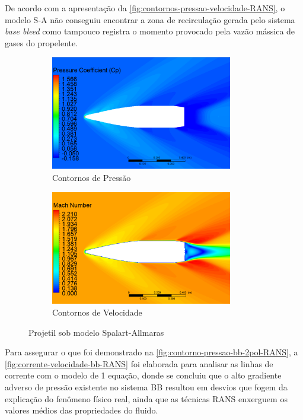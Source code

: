 De acordo com a apresentação da \autoref{fig:contornos-pressao-velocidade-RANS}, o modelo S-A não conseguiu encontrar a zona de recirculação gerada pelo sistema \textit{base bleed} como tampouco registra o momento provocado pela vazão mássica de gases do propelente.

\begin{figure}[!ht]
	\centering
	\begin{subfigure}[b]{0.47\textwidth}
        \centering
        \includegraphics[height=5cm,width=\textwidth]{contorno-pressao-SPALART-2pol.png}
        \caption{Contornos de Pressão}
        \label{fig:contorno-pressao-bb-2pol-RANS}
    \end{subfigure}
    \hfill
    \begin{subfigure}[b]{0.47\textwidth}
        \centering
        \includegraphics[height=5cm,width=\textwidth]{contorno-velocidade-SPALART-2pol.png}
        \caption{Contornos de Velocidade}
        \label{fig:contorno-velocidade-bb-2pol-RANS}
    \end{subfigure}
	\caption{Projetil sob modelo Spalart-Allmaras}
	\label{fig:contornos-pressao-velocidade-RANS}
\end{figure}

Para assegurar o que foi demonstrado na \autoref{fig:contorno-pressao-bb-2pol-RANS}, a \autoref{fig:corrente-velocidade-bb-RANS} foi elaborada para analisar as linhas de corrente com o modelo de 1 equação, donde se concluiu que o alto gradiente adverso de pressão existente no sistema BB resultou em desvios que fogem da explicação do fenômeno físico real, ainda que as técnicas RANS enxerguem os valores médios das propriedades do fluido.

